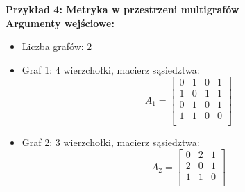 \vspace{1em}

\noindent \textbf{Przykład 4: Metryka w przestrzeni multigrafów} \\

\noindent \textbf{Argumenty wejściowe:}
\begin{itemize}
    \item Liczba grafów: \(2\)
    \item Graf 1: \(4\) wierzchołki, macierz sąsiedztwa:
    \[
    A_1 = \begin{bmatrix}
    0 & 1 & 0 & 1 \\
    1 & 0 & 1 & 1 \\
    0 & 1 & 0 & 1 \\
    1 & 1 & 0 & 0 \\
    \end{bmatrix}
    \]
    \item Graf 2: \(3\) wierzchołki, macierz sąsiedztwa:
    \[
    A_2 = \begin{bmatrix}
    0 & 2 & 1 \\
    2 & 0 & 1 \\
    1 & 1 & 0 \\
    \end{bmatrix}
    \]
\end{itemize}

